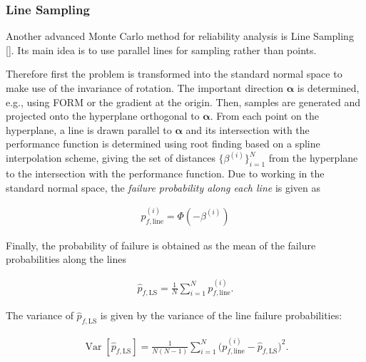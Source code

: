 \subsubsection{Line Sampling}



\label{12507279593722163479}{}


Another advanced Monte Carlo method for reliability analysis is Line Sampling []. Its main idea is to use parallel lines for sampling rather than points.



Therefore first the problem is transformed into the standard normal space to make use of the invariance of rotation. The important direction \(\boldsymbol{\alpha}\) is determined, e.g., using FORM or the gradient at the origin. Then, samples are generated and projected onto the hyperplane orthogonal to \(\boldsymbol{\alpha}\). From each point on the hyperplane, a line is drawn parallel to \(\boldsymbol{\alpha}\) and its intersection with the performance function is determined using root finding based on a spline interpolation scheme, giving the set of distances \(\{\beta^{(i)}\}_{i=1}^N\) from the hyperplane to the intersection with the performance function. Due to working in the standard normal space, the \emph{failure probability along each line} is given as



\begin{equation*}
\begin{split}p_{f, \mathrm{line}}^{(i)} = \Phi(-\beta^{(i)})\end{split}\end{equation*}


Finally, the probability of failure is obtained as the mean of the failure probabilities along the lines



\begin{equation*}
\begin{split}\hat{p}_{f,\mathrm{LS}} = \frac{1}{N} \sum_{i=1}^N p_{f, \mathrm{line}}^{(i)}.\end{split}\end{equation*}


The variance of \(\hat{p}_{f,\mathrm{LS}}\) is given by the variance of the line failure probabilities:



\begin{equation*}
\begin{split}\operatorname{Var}[\hat{p}_{f,\mathrm{LS}}] = \frac{1}{N(N-1)} \sum_{i=1}^N \Big(p_{f, \mathrm{line}}^{(i)} - \hat{p}_{f,\mathrm{LS}}\Big)^2.\end{split}\end{equation*}


